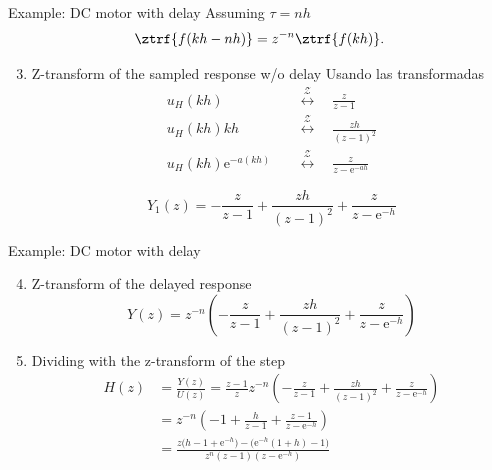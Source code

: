 \documentclass[presentation,aspectratio=169]{beamer}
\begin{document}
\begin{frame}[label={sec:orgb5b9ccc}]{Example: DC motor with delay}
Assuming \(\tau = nh\)
\[ \ztrf{f(kh-nh)} = z^{-n}\ztrf{f(kh)}.\]
\begin{enumerate}
\setcounter{enumi}{2}
\item \alert{Z-transform of the sampled response w/o delay} 
Usando las transformadas
\begin{align*}
u_H(kh) \quad &\overset{\mathcal{Z}}{\longleftrightarrow} \quad \frac{z}{z-1}\\
u_H(kh)kh \quad &\overset{\mathcal{Z}}{\longleftrightarrow} \quad \frac{zh}{(z-1)^2}\\
u_H(kh)\mathrm{e}^{-a(kh)} \quad &\overset{\mathcal{Z}}{\longleftrightarrow} \quad \frac{z}{z-\mathrm{e}^{-ah}}
\end{align*}

\pause
\[Y_1(z) = -\frac{z}{z-1} + \frac{zh}{(z-1)^2} + \frac{z}{z-\mathrm{e}^{-h}}\]
\end{enumerate}
\end{frame}

\begin{frame}[label={sec:org4d66e20}]{Example: DC motor with delay}
\begin{enumerate}
\setcounter{enumi}{3}
\item \alert{Z-transform of the delayed response}
\[ Y(z) = z^{-n} \left(-\frac{z}{z-1} + \frac{zh}{(z-1)^2} + \frac{z}{z-\mathrm{e}^{-h}}\right)\]
\item \alert{Dividing with the z-transform of the step} 
\begin{align*}
H(z) &= \frac{Y(z)}{U(z)} = \frac{z-1}{z} z^{-n} \left(-\frac{z}{z-1} + \frac{zh}{(z-1)^2} + \frac{z}{z-\mathrm{e}^{-h}}\right)\\
&= z^{-n} \left( -1 + \frac{h}{z-1} + \frac{z-1}{z-\mathrm{e}^{-h}} \right)\\
&= \frac{ z\big( h-1+\mathrm{e}^{-h}\big) - \big(\mathrm{e}^{-h}(1+h) - 1\big)}{z^n(z-1)(z-\mathrm{e}^{-h})}
\end{align*}
\end{enumerate}
\end{frame}
\end{document}
